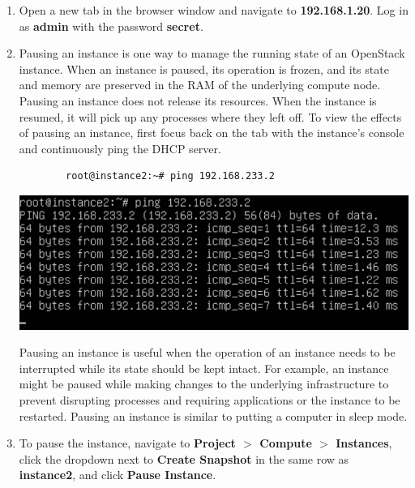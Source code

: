 \documentclass[letterpaper, 12pt]{article}
\begin{document}
\begin{enumerate}
    \item Open a new tab in the browser window and navigate to \textbf{192.168.1.20}.
    Log in as \textbf{admin} with the password \textbf{secret}.

    \item Pausing an instance is one way to manage the running state of an OpenStack instance.
    When an instance is paused, its operation is frozen, and its state and memory are preserved in the RAM of the underlying compute node.
    Pausing an instance does not release its resources.
    When the instance is resumed, it will pick up any processes where they left off.
    To view the effects of pausing an instance, first focus back on the tab with the instance's console and continuously ping the DHCP server.
    \begin{lstlisting}
        root@instance2:~# ping 192.168.233.2
    \end{lstlisting}

    \begin{center}
        \includegraphics[width=\linewidth]{images/part3/step2.png}
    \end{center}

    \begin{tipbox}
        Pausing an instance is useful when the operation of an instance needs to be interrupted while its state should be kept intact.
        For example, an instance might be paused while making changes to the underlying infrastructure to prevent disrupting processes and requiring applications or the instance to be restarted.
        Pausing an instance is similar to putting a computer in sleep mode.
    \end{tipbox}

    \item To pause the instance, navigate to \textbf{Project $>$ Compute $>$ Instances}, click the dropdown next to \textbf{Create Snapshot} in the same row as \textbf{instance2}, and click \textbf{Pause Instance}.


\end{enumerate}
\end{document}
